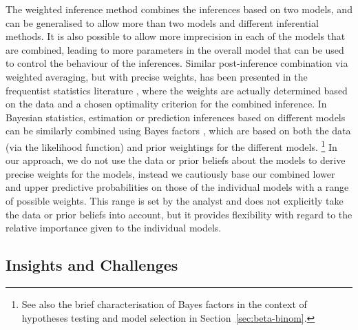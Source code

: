 The weighted inference method combines the inferences based on two
models, and can be generalised to allow more than two models and
different inferential methods. It is also possible to allow more
imprecision in each of the models that are combined, leading to more
parameters in the overall model that can be used to control the
behaviour of the inferences. Similar post-inference combination via
weighted averaging, but with precise weights, has been presented in the
frequentist statistics literature \parencite{2003:hjort,2003:longford}, where the
weights are actually determined based on the data and a chosen
optimality criterion for the combined inference. In Bayesian
statistics, estimation or prediction inferences based on different
models can be similarly combined using Bayes factors \parencite{1995:kass-raftery},
which are based on both the data (via the likelihood function) and
prior weightings for the different models.%
\footnote{See also the brief characterisation of Bayes factors
in the context of hypotheses testing and model selection in Section~\ref{sec:beta-binom}.}
In our approach, we do not use the data or prior beliefs about the models to derive precise
weights for the models, instead we cautiously base our combined
lower and upper predictive probabilities on those of the individual
models with a range of possible weights. This range is set by the
analyst and does not explicitly take the data or prior beliefs into
account, but it provides flexibility with regard to the relative
importance given to the individual models.


\subsection{Insights and Challenges}
\label{sec:insights}

